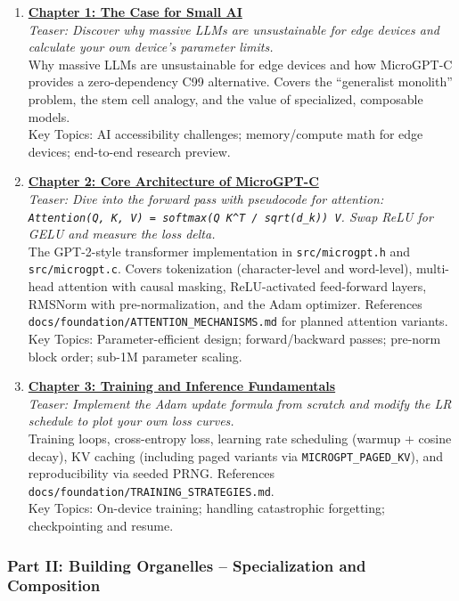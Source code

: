 \documentclass[
]{article}
\begin{document}
\begin{enumerate}
\def\labelenumi{\arabic{enumi}.}
\item
  \textbf{\href{1.md}{Chapter 1: The Case for Small AI}}\\
  \emph{Teaser: Discover why massive LLMs are unsustainable for edge
  devices and calculate your own device's parameter limits.}\\
  Why massive LLMs are unsustainable for edge devices and how MicroGPT-C
  provides a zero-dependency C99 alternative. Covers the ``generalist
  monolith'' problem, the stem cell analogy, and the value of
  specialized, composable models.\\
  Key Topics: AI accessibility challenges; memory/compute math for edge
  devices; end-to-end research preview.
\item
  \textbf{\href{2.md}{Chapter 2: Core Architecture of MicroGPT-C}}\\
  \emph{Teaser: Dive into the forward pass with pseudocode for
  attention:
  \texttt{Attention(Q,\ K,\ V)\ =\ softmax(Q\ K\^{}T\ /\ sqrt(d\_k))\ V}.
  Swap ReLU for GELU and measure the loss delta.}\\
  The GPT-2-style transformer implementation in \texttt{src/microgpt.h}
  and \texttt{src/microgpt.c}. Covers tokenization (character-level and
  word-level), multi-head attention with causal masking, ReLU-activated
  feed-forward layers, RMSNorm with pre-normalization, and the Adam
  optimizer. References
  \texttt{docs/foundation/ATTENTION\_MECHANISMS.md} for planned
  attention variants.\\
  Key Topics: Parameter-efficient design; forward/backward passes;
  pre-norm block order; sub-1M parameter scaling.
\item
  \textbf{\href{3.md}{Chapter 3: Training and Inference Fundamentals}}\\
  \emph{Teaser: Implement the Adam update formula from scratch and
  modify the LR schedule to plot your own loss curves.}\\
  Training loops, cross-entropy loss, learning rate scheduling (warmup +
  cosine decay), KV caching (including paged variants via
  \texttt{MICROGPT\_PAGED\_KV}), and reproducibility via seeded PRNG.
  References \texttt{docs/foundation/TRAINING\_STRATEGIES.md}.\\
  Key Topics: On-device training; handling catastrophic forgetting;
  checkpointing and resume.
\end{enumerate}

\subsubsection{Part II: Building Organelles -- Specialization and
Composition}\label{part-ii-building-organelles-specialization-and-composition}
\end{document}
